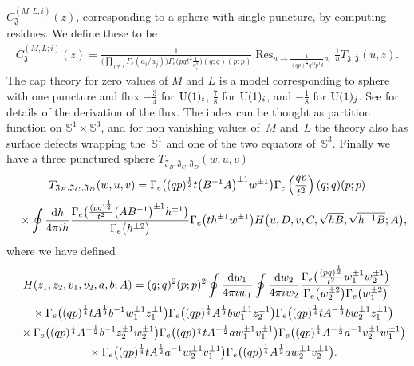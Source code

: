 \documentclass[a4paper,12pt]{article}
\begin{document}
\allowdisplaybreaks
$C^{(M,L; i)}_{{\mathfrak J}}(z)$, corresponding to a sphere with single puncture, by computing residues. We define these to be
\begin{gather*}
C^{(M,L;i)}_{{\mathfrak J}}(z)=\frac1{\Big(\prod\limits_{j\neq i}\Gamma_e(a_i/a_j)\Big)\Gamma_e\big( pq t^2\frac1{a_i^2}\big)(q;q)(p;p)}\operatorname{Res}_{u\to \frac1{(q p)^{\frac12} q^M p^L t} a_i} \frac1u T_{{\mathfrak J},\overline{\mathfrak J}}(u,z) .
\end{gather*}
 The cap theory for zero values of $M$ and $L$ is a model corresponding to sphere with one puncture and flux $-\frac34$ for ${\rm U}(1)_t$, $\frac78$ for ${\rm U}(1)_i$, and $-\frac18$ for ${\rm U}(1)_j$. See for details of the derivation of the flux.
The index can be thought as partition function on ${\mathbb S}^1\times {\mathbb S}^3$, and for non vanishing values of~$M$ and~$L$ the theory
also has surface defects wrapping the~${\mathbb S}^1$ and one of the two equators of~${\mathbb S}^3$. Finally we have a three punctured sphere $T_{{\mathfrak J}_B,{\mathfrak J}_C,{\mathfrak J}_D}(w,u,v)$
\begin{gather*}
T_{{\mathfrak J}_B,{\mathfrak J}_C,{\mathfrak J}_D}(w,u,v) = \Gamma_e\big((q p)^{\frac12} t\big(B^{-1}A\big)^{\pm1} w^{\pm1}\big)\Gamma_e\left(\frac{q p}{t^2}\right) (q;q)(p;p)\\
\quad{} \times \oint \frac{{\rm d} h}{4\pi i h} \frac{\Gamma_e\big(\frac{(p q)^{\frac12}}{t^2}\big(A B^{-1}\big)^{\pm1}h^{\pm1}\big)}{\Gamma_e\big(h^{\pm2}\big)}\Gamma_e\big(t h^{\pm1} w^{\pm1}\big) H\big(u,D,v,C,\sqrt{h B},\sqrt{h^{-1}B}; A\big),
\end{gather*} where we have defined
\begin{gather}
H(z_1,z_2,v_1,v_2, a , b; A ) = (q;q)^2(p;p)^2\oint\frac{{\rm d}w_1}{4\pi i w_1}\oint \frac{{\rm d}w_2}{4\pi i w_2} \frac{\Gamma_e\big(\frac{(p q)^{\frac12}}{t^2}w_1^{\pm1}w_2^{\pm1}\big)}{\Gamma_e\big(w_2^{\pm2}\big)\Gamma_e\big(w_1^{\pm2}\big)} \nonumber\\
 \quad{} \times \Gamma_e\big( (q p)^{\frac14}t A^{\frac12}b^{-1} w_1^{\pm1}z_1^{\pm1}\big) \Gamma_e\big((qp)^{\frac14} A^{\frac12} bw_1^{\pm1}z_2^{\pm1}\big)\Gamma_e\big((q p)^{\frac14} t A^{-\frac12} b w_2^{\pm1} z_1^{\pm1}\big)\nonumber\\
\quad{} \times \Gamma_e \big((q p)^{\frac14} A^{-\frac12} b^{-1} z_2^{\pm1}w_2^{\pm1}\big) \Gamma_e\big((q p)^{\frac14} t A^{-\frac12} a w_1^{\pm1} v_1^{\pm1}\big)\Gamma_e\big( ( q p)^{\frac14} A^{-\frac12} a^{-1} v_2^{\pm1} w_1^{\pm1}\big)\nonumber\\
\quad{} \times \Gamma_e\big( ( q p )^{\frac14} t A^{\frac12} a^{-1} w_2^{\pm1} v_1^{\pm1}\big) \Gamma_e\big( ( q p )^{\frac14} A^{\frac12} a w_2^{\pm1} v_2^{\pm1}\big) . 
 \end{gather}
\end{document}
